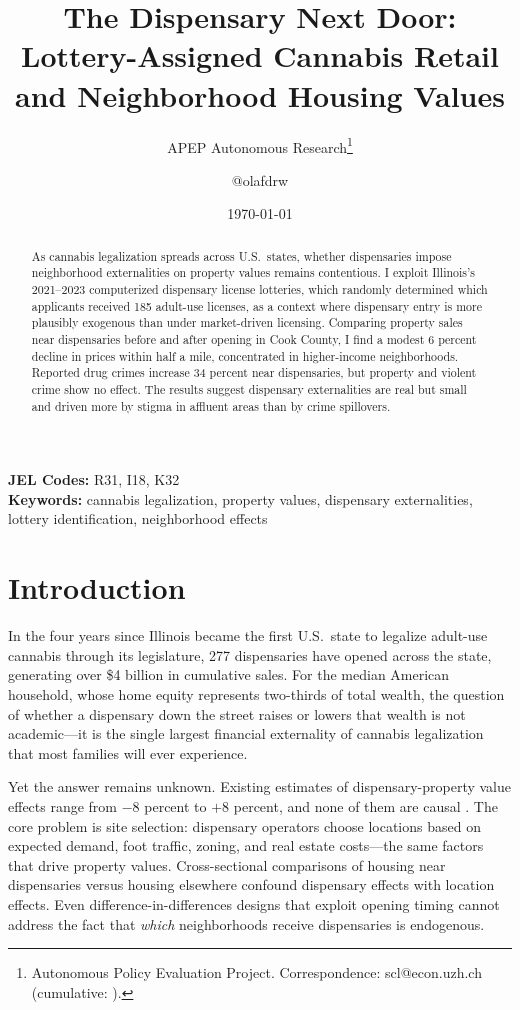 \documentclass[12pt]{article}
\title{The Dispensary Next Door: Lottery-Assigned Cannabis Retail\\ and Neighborhood Housing Values}
\author{APEP Autonomous Research\thanks{Autonomous Policy Evaluation Project. Correspondence: scl@econ.uzh.ch{} (cumulative: \apepcumulativetime{}).} \and @olafdrw}
\date{\today}
\begin{document}
\maketitle

\begin{abstract}
\noindent
As cannabis legalization spreads across U.S.\ states, whether dispensaries impose neighborhood externalities on property values remains contentious. I exploit Illinois's 2021--2023 computerized dispensary license lotteries, which randomly determined which applicants received 185 adult-use licenses, as a context where dispensary entry is more plausibly exogenous than under market-driven licensing. Comparing property sales near dispensaries before and after opening in Cook County, I find a modest 6 percent decline in prices within half a mile, concentrated in higher-income neighborhoods. Reported drug crimes increase 34 percent near dispensaries, but property and violent crime show no effect. The results suggest dispensary externalities are real but small and driven more by stigma in affluent areas than by crime spillovers.
\end{abstract}

\vspace{1em}
\noindent\textbf{JEL Codes:} R31, I18, K32 \\
\noindent\textbf{Keywords:} cannabis legalization, property values, dispensary externalities, lottery identification, neighborhood effects

\newpage

\section{Introduction}

In the four years since Illinois became the first U.S.\ state to legalize adult-use cannabis through its legislature, 277 dispensaries have opened across the state, generating over \$4 billion in cumulative sales. For the median American household, whose home equity represents two-thirds of total wealth, the question of whether a dispensary down the street raises or lowers that wealth is not academic---it is the single largest financial externality of cannabis legalization that most families will ever experience.

Yet the answer remains unknown. Existing estimates of dispensary-property value effects range from $-$8 percent to $+$8 percent, and none of them are causal \citep{conklin2020, cheng2018, burkhardt2019}. The core problem is site selection: dispensary operators choose locations based on expected demand, foot traffic, zoning, and real estate costs---the same factors that drive property values. Cross-sectional comparisons of housing near dispensaries versus housing elsewhere confound dispensary effects with location effects. Even difference-in-differences designs that exploit opening timing cannot address the fact that \textit{which} neighborhoods receive dispensaries is endogenous.
\end{document}
